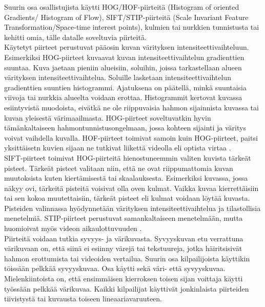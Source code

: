 Suurin osa osallistujista käytti HOG/HOF-piirteitä (Histogram of oriented Gradients/ Histogram of Flow), SIFT/STIP-piirteitä 
(Scale Invariant Feature Transformation/Space-time interest points), 
kulmien tai nurkkien tunnistusta tai kehitti omia, tälle datalle soveltuvia piirteitä.\citep {6239178}\\

Käytetyt piirteet perustuvat pääosin kuvan värityksen intensiteettivaihteluun.
Esimerkiksi HOG-piirteet kuvaavat kuvan intensiteettivaihtelun gradienttien suuntaa. Kuva jaetaan pieniin alueisiin, soluihin, 
joissa tarkastellaan alueen värityksen intensiteettivaihtelua. Soluille lasketaan intensiteettivaihtelun gradienttien suuntien histogrammi. 
Ajatuksena on päätellä, minkä suuntaisia viivoja tai nurkkia alueelta voidaan erottaa.\citep {1467360} Histogrammit kertovat kuvassa esiintyvistä
muodoista, eivätkä ne ole riippuvaisia hahmon sijainnista kuvassa tai kuvan yleisestä värimaailmasta.
HOG-piirteet soveltuvatkin hyvin tämänkaltaiseen hahmontunnistusongelmaan, jossa kohteen sijainti ja väritys voivat vaihdella kuvalla.
HOF-piirteet toimivat samoin kuin HOG-piirteet, paitsi yksittäisetn kuvien sijaan ne tutkivat liikettä videolla eli optista virtaa \citep{Pers20101369}.\\

SIFT-piirteet toimivat HOG-piirteitä hienostuneemmin valiten kuvista tärkeät pisteet. Tärkeät pisteet valitaan niin, että ne ovat riippumattomia
kuvan muutoksista kuten kiertämisestä tai skaalauksesta. Esimerkiksi kuvassa, jossa näkyy ovi, tärkeitä pisteitä voisivat olla oven kulmat.
Vaikka kuvaa kierrettäisiin tai sen kokoa muutettaisiin, tärkeät pisteet eli kulmat voidaan löytää kuvasta.
Pisteiden valinnassa hyödynnetään värityksen intensiteettivaihtelua ja tilastollisia menetelmiä.  \citep {790410}
STIP-piirteet perustuvat samankaltaiseen menetelmään, mutta huomioivat myös videon aikaulottuvuuden \citep{1238378}. \\

Piirteitä voidaan tutkia syvyys- ja värikuvasta. Syvyyskuvan etu verrattuna värikuvaan on, että siinä
ei esiinny värejä tai tekstuureja, jotka häiritsisivät hahmon erottumista tai videoiden vertailua.
Suurin osa kilpailijoista käyttikin töissään pelkkää syvyyskuvaa. Osa käytti sekä väri- että syvyyskuvaa. 
Mielenkiintoista on, että ensimmäisen kierroksen toisen sijan voittaja käytti työssään pelkkää värikuvaa. 
Kaikki kilpailijat käyttivät jonkinlaista piirteiden tiivistystä tai kuvausta toiseen lineaariavaruuteen. \citep {6239178}\\ 

